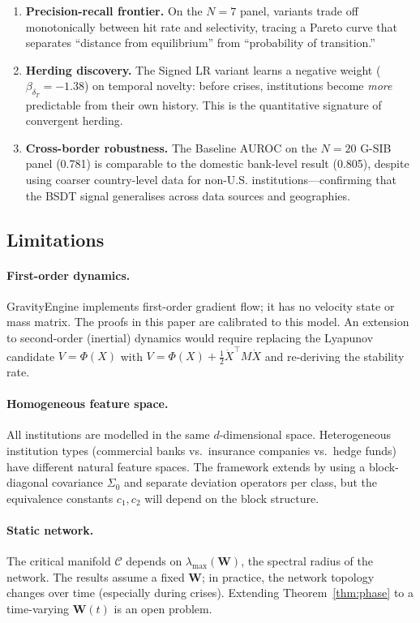\documentclass[11pt]{article}
\theoremstyle{definition}
\newcommand{\Cman}{\mathcal{C}}
\newcommand{\lmax}{\lambda_{\max}}
\begin{document}
\begin{enumerate}
  \item \textbf{Precision-recall frontier.}  On the $N=7$ panel, variants
    trade off monotonically between hit rate and selectivity, tracing a
    Pareto curve that separates ``distance from equilibrium'' from
    ``probability of transition.''

  \item \textbf{Herding discovery.}  The Signed LR variant learns a negative
    weight ($\beta_{\delta_T} = -1.38$) on temporal novelty: before crises,
    institutions become \emph{more} predictable from their own history.
    This is the quantitative signature of convergent herding.

  \item \textbf{Cross-border robustness.}  The Baseline AUROC on the
    $N=20$ G-SIB panel (0.781) is comparable to the domestic bank-level
    result (0.805), despite using coarser country-level data for non-U.S.
    institutions---confirming that the BSDT signal generalises across
    data sources and geographies.
\end{enumerate}

\subsection{Limitations}

\paragraph{First-order dynamics.}
GravityEngine implements first-order gradient flow; it has no velocity state
or mass matrix.  The proofs in this paper are calibrated to this model.
An extension to second-order (inertial) dynamics would require replacing the
Lyapunov candidate $V = \Phi(X)$ with $V = \Phi(X) + \frac{1}{2}\dot X^\top M \dot X$
and re-deriving the stability rate.

\paragraph{Homogeneous feature space.}
All institutions are modelled in the same $d$-dimensional space.  Heterogeneous
institution types (commercial banks vs.\ insurance companies vs.\ hedge funds) have
different natural feature spaces.  The framework extends by using a block-diagonal
covariance $\Sigma_0$ and separate deviation operators per class, but the
equivalence constants $c_1, c_2$ will depend on the block structure.

\paragraph{Static network.}
The critical manifold $\Cman$ depends on $\lmax(\mathbf{W})$, the spectral radius
of the network.  The results assume a fixed $\mathbf{W}$; in practice, the
network topology changes over time (especially during crises).  Extending
Theorem~\ref{thm:phase} to a time-varying $\mathbf{W}(t)$ is an open problem.
\end{document}
